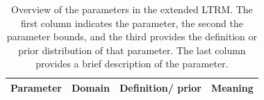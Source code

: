 \documentclass[a4paper,usenames,dvipsnames]{article}
\newenvironment{revision}{\color{black}}{\color{black}}
\begin{document}
\protect\begin{revision}
	
	\begin{table}[!ht]
		
		\centering
		\caption{\protect\begin{revision}Overview of the parameters in the extended LTRM. The first column indicates the parameter, the second the parameter bounds, and the third provides the definition or prior distribution of that parameter. The last column provides a brief description of the parameter.\protect\end{revision}}%
		
		\label{tb:ExtendedLTRMparameterOverview}
		
		\begin{tabular}{llll}
			
			\toprule
			
			Parameter & Domain & Definition/ prior & Meaning\\
			
			\midrule
			

\end{tabular}
\end{table}
\end{revision}
\end{document}
